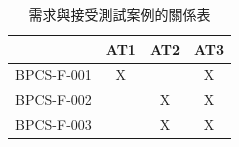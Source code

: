				\begin{table}[htbp]
				\centering
				\caption{需求與接受測試案例的關係表}
				\label{table12}
				\begin{tabular}{|l|c|c|c|}
				\hline
				 & \multicolumn{1}{l|}{AT1} & \multicolumn{1}{l|}{AT2} & \multicolumn{1}{l|}{AT3} \\ \hline
				BPCS-F-001 & X &  & X \\ \hline
				BPCS-F-002 &  & X & X \\ \hline
				BPCS-F-003 &  & X & X \\ \hline
				\end{tabular}
				\end{table}


	